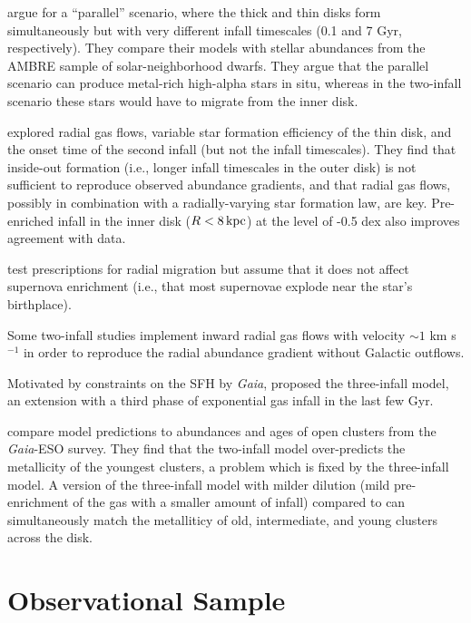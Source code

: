 \documentclass[twocolumn,twocolappendix,linenumbers]{aastex631}
\begin{document}
\citet{grisoni_ambre_2017} argue for a ``parallel'' scenario, where the thick and thin disks form simultaneously but with very different infall timescales (0.1 and 7 Gyr, respectively). They compare their models with stellar abundances from the AMBRE sample of solar-neighborhood dwarfs. They argue that the parallel scenario can produce metal-rich high-alpha stars in situ, whereas in the two-infall scenario these stars would have to migrate from the inner disk.

\citet{palla_chemical_2020} explored radial gas flows, variable star formation efficiency of the thin disk, and the onset time of the second infall (but not the infall timescales). They find that inside-out formation (i.e., longer infall timescales in the outer disk) is not sufficient to reproduce observed abundance gradients, and that radial gas flows, possibly in combination with a radially-varying star formation law, are key. Pre-enriched infall in the inner disk ($R<8\,{\rm kpc}$) at the level of -0.5 dex also improves agreement with data.

\citet{palla_mgfe_2022} test prescriptions for radial migration but assume that it does not affect supernova enrichment (i.e., that most supernovae explode near the star's birthplace).

Some two-infall studies \citep[e.g.,][]{spitoni_effects_2011,palla_chemical_2020,palla_mapping_2024} implement inward radial gas flows with velocity $\sim1$ km s$^{-1}$ in order to reproduce the radial abundance gradient without Galactic outflows.

Motivated by constraints on the SFH by {\it Gaia}, \citet{spitoni_beyond_2023} proposed the three-infall model, an extension with a third phase of exponential gas infall in the last few Gyr.

\citet{palla_mapping_2024} compare model predictions to abundances and ages of open clusters from the {\it Gaia}-ESO survey. They find that the two-infall model over-predicts the metallicity of the youngest clusters, a problem which is fixed by the three-infall model. A version of the three-infall model with milder dilution (mild pre-enrichment of the gas with a smaller amount of infall) compared to \citet{spitoni_beyond_2023} can simultaneously match the metalliticy of old, intermediate, and young clusters across the disk.

\citet{spitoni_remind_2024}

\section{Observational Sample}
\label{sec:observational-sample}
\end{document}

